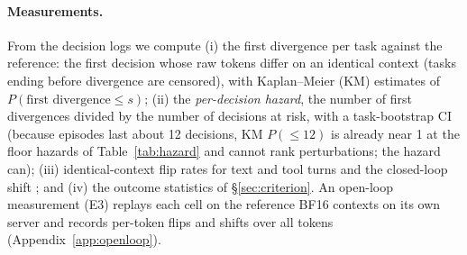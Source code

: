\paragraph{Measurements.} From the decision logs we compute (i) the first divergence per task against the reference: the first decision whose raw tokens differ on an identical context (tasks ending before divergence are censored), with Kaplan--Meier (KM) estimates of $P(\text{first divergence} \le s)$; (ii) the \emph{per-decision hazard}, the number of first divergences divided by the number of decisions at risk, with a task-bootstrap CI (because episodes last about 12 decisions, KM $P(\le 12)$ is already near 1 at the floor hazards of Table~\ref{tab:hazard} and cannot rank perturbations; the hazard can); (iii) identical-context flip rates for text and tool turns and the closed-loop shift \absd{}; and (iv) the outcome statistics of \S\ref{sec:criterion}. An open-loop measurement (E3) replays each cell on the reference BF16 contexts on its own server and records per-token flips and shifts over all tokens (Appendix~\ref{app:openloop}).
